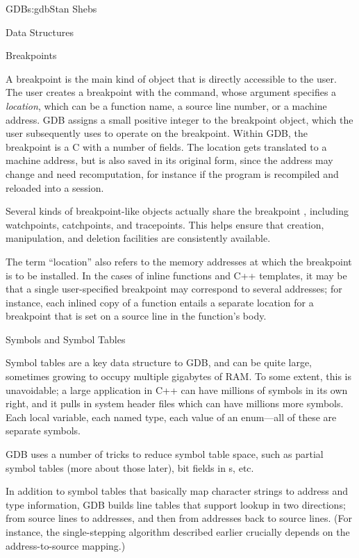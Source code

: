 \begin{aosachapter}{GDB}{s:gdb}{Stan Shebs}
\begin{aosasect1}{Data Structures}
\end{aosasect1}

\begin{aosasect2}{Breakpoints}

A breakpoint is the main kind of object that is directly accessible to
the user.  The user creates a breakpoint with the 
command, whose argument specifies a {\em location}, which can be a
function name, a source line number, or a machine address.  GDB
assigns a small positive integer to the breakpoint object, which the
user subsequently uses to operate on the breakpoint.  Within GDB, the
breakpoint is a C  with a number of fields.  The location gets
translated to a machine address, but is also saved in its original
form, since the address may change and need recomputation, for
instance if the program is recompiled and reloaded into a session.

Several kinds of breakpoint-like objects actually share the breakpoint
, including watchpoints, catchpoints, and tracepoints.  This
helps ensure that creation, manipulation, and deletion facilities are
consistently available.

The term ``location'' also refers to the memory addresses at which the
breakpoint is to be installed.  In the cases of inline functions and
C++ templates, it may be that a single user-specified breakpoint may
correspond to several addresses; for instance, each inlined copy of a
function entails a separate location for a breakpoint that is set on a
source line in the function's body.

\end{aosasect2}

\begin{aosasect2}{Symbols and Symbol Tables}

Symbol tables are a key data structure to GDB, and can be quite large,
sometimes growing to occupy multiple gigabytes of RAM.  To some
extent, this is unavoidable; a large application in C++ can have
millions of symbols in its own right, and it pulls in system header
files which can have millions more symbols.  Each local variable, each
named type, each value of an enum---all of these are separate symbols.

GDB uses a number of tricks to reduce symbol table space, such as
partial symbol tables (more about those later), bit fields in s,
etc.

In addition to symbol tables that basically map character strings to
address and type information, GDB builds line tables that support
lookup in two directions; from source lines to addresses, and then
from addresses back to source lines.  (For instance, the
single-stepping algorithm described earlier crucially depends on the
address-to-source mapping.)


\end{aosasect2}
\end{aosachapter}
